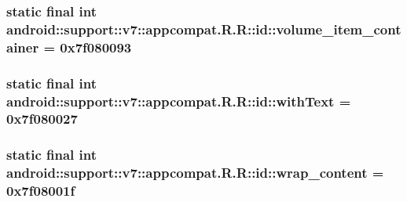 \hypertarget{classandroid_1_1support_1_1v7_1_1appcompat_1_1_r_1_1id_a8c74328fa7b241a4cf3d64c962a6b90}{
\subsubsection[{volume\_\-item\_\-container}]{\setlength{\rightskip}{0pt plus 5cm}static final int android::support::v7::appcompat.R.R::id::volume\_\-item\_\-container = 0x7f080093}}
\label{classandroid_1_1support_1_1v7_1_1appcompat_1_1_r_1_1id_a8c74328fa7b241a4cf3d64c962a6b90}


\hypertarget{classandroid_1_1support_1_1v7_1_1appcompat_1_1_r_1_1id_3d300fb4a805bb784dafb5e229edcd0f}{
\subsubsection[{withText}]{\setlength{\rightskip}{0pt plus 5cm}static final int android::support::v7::appcompat.R.R::id::withText = 0x7f080027}}
\label{classandroid_1_1support_1_1v7_1_1appcompat_1_1_r_1_1id_3d300fb4a805bb784dafb5e229edcd0f}


\hypertarget{classandroid_1_1support_1_1v7_1_1appcompat_1_1_r_1_1id_eccc4f04e50072fcbb2b7f4b0017cb93}{
\subsubsection[{wrap\_\-content}]{\setlength{\rightskip}{0pt plus 5cm}static final int android::support::v7::appcompat.R.R::id::wrap\_\-content = 0x7f08001f}}
\label{classandroid_1_1support_1_1v7_1_1appcompat_1_1_r_1_1id_eccc4f04e50072fcbb2b7f4b0017cb93}





